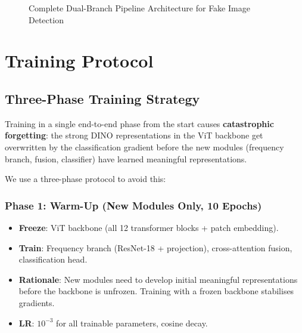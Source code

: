 \documentclass[12pt,a4paper]{article}
\begin{document}
\begin{figure}[h]
\caption{Complete Dual-Branch Pipeline Architecture for Fake Image Detection}
\label{fig:architecture}
\end{figure}

\newpage

\section{Training Protocol}

\subsection{Three-Phase Training Strategy}

Training in a single end-to-end phase from the start causes \textbf{catastrophic
forgetting}: the strong DINO representations in the ViT backbone get overwritten by the
classification gradient before the new modules (frequency branch, fusion, classifier)
have learned meaningful representations.

We use a three-phase protocol to avoid this:

\subsubsection{Phase 1: Warm-Up (New Modules Only, 10 Epochs)}

\begin{itemize}[leftmargin=1.5em]
  \item \textbf{Freeze}: ViT backbone (all 12 transformer blocks + patch embedding).
  \item \textbf{Train}: Frequency branch (ResNet-18 + projection), cross-attention fusion,
    classification head.
  \item \textbf{Rationale}: New modules need to develop initial meaningful representations
    before the backbone is unfrozen. Training with a frozen backbone stabilises gradients.
  \item \textbf{LR}: $10^{-3}$ for all trainable parameters, cosine decay.
\end{itemize}
\end{document}
